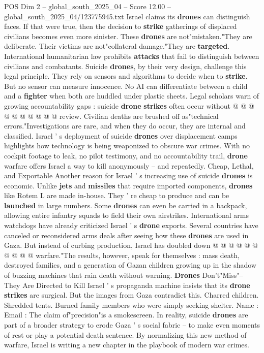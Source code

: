 \begin{textsample}{POS Dim 2 – global\_south\_2025\_04 – Score 12.00 – global\_south\_2025\_04/123775945.txt}
Israel claims its \textbf{drones} can distinguish faces.
If that were true, then the decision to \textbf{strike} gatherings of displaced civilians becomes even more sinister.
These \textbf{drones} are not"mistaken."They are deliberate.
Their victims are not"collateral damage."They are \textbf{targeted}.
International humanitarian law prohibits \textbf{attacks} that fail to distinguish between civilians and combatants.
Suicide \textbf{drones}, by their very design, challenge this legal principle.
They rely on sensors and algorithms to decide when to \textbf{strike}.
But no sensor can measure innocence.
No AI can differentiate between a child and a \textbf{fighter} when both are huddled under plastic sheets.
Legal scholars warn of growing accountability gaps : suicide \textbf{drone} \textbf{strikes} often occur without @ @ @ @ @ @ @ @ @ @ review.
Civilian deaths are brushed off as"technical errors."Investigations are rare, and when they do occur, they are internal and classified.
Israel ' s deployment of suicide \textbf{drones} over displacement camps highlights how technology is being weaponized to obscure war crimes.
With no cockpit footage to leak, no pilot testimony, and no accountability trail, \textbf{drone} warfare offers Israel a way to kill anonymously -- and repeatedly.
Cheap, Lethal, and Exportable Another reason for Israel ' s increasing use of suicide \textbf{drones} is economic.
Unlike \textbf{jets} and \textbf{missiles} that require imported components, \textbf{drones} like Rotem L are made in-house.
They ' re cheap to produce and can be \textbf{launched} in large numbers.
Some \textbf{drones} can even be carried in a backpack, allowing entire infantry squads to field their own airstrikes.
International arms watchdogs have already criticized Israel ' s \textbf{drone} exports.
Several countries have canceled or reconsidered arms deals after seeing how these \textbf{drones} are used in Gaza.
But instead of curbing production, Israel has doubled down @ @ @ @ @ @ @ @ @ @ warfare."The results, however, speak for themselves : mass death, destroyed families, and a generation of Gazan children growing up in the shadow of buzzing machines that rain death without warning. \textbf{Drones} Don't"Miss"-- They Are Directed to Kill Israel ' s propaganda machine insists that its \textbf{drone} \textbf{strikes} are surgical.
But the images from Gaza contradict this.
Charred children.
Shredded tents.
Burned family members who were simply seeking shelter.
Name : Email : The claim of"precision"is a smokescreen.
In reality, suicide \textbf{drones} are part of a broader strategy to erode Gaza ' s social fabric -- to make even moments of rest or play a potential death sentence.
By normalizing this new method of warfare, Israel is writing a new chapter in the playbook of modern war crimes.

\end{textsample}
